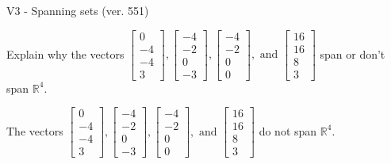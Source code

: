 \begin{exercise}
  \begin{exerciseTitle}V3 - Spanning sets (ver. 551)\end{exerciseTitle}
  \begin{exerciseStatement}
    Explain why the vectors \(\left[\begin{array}{r}
0 \\
-4 \\
-4 \\
3
\end{array}\right] , \left[\begin{array}{r}
-4 \\
-2 \\
0 \\
-3
\end{array}\right] , \left[\begin{array}{r}
-4 \\
-2 \\
0 \\
0
\end{array}\right] , \text{ and } \left[\begin{array}{r}
16 \\
16 \\
8 \\
3
\end{array}\right]\) span or don't span \(\mathbb{R}^4\). 
	


  \end{exerciseStatement}
  \begin{exerciseAnswer}
   The vectors \(\left[\begin{array}{r}
0 \\
-4 \\
-4 \\
3
\end{array}\right] , \left[\begin{array}{r}
-4 \\
-2 \\
0 \\
-3
\end{array}\right] , \left[\begin{array}{r}
-4 \\
-2 \\
0 \\
0
\end{array}\right] , \text{ and } \left[\begin{array}{r}
16 \\
16 \\
8 \\
3
\end{array}\right]\) 
  	 do not  
	span \(\mathbb{R}^4\).
  


  \end{exerciseAnswer}
\end{exercise}
